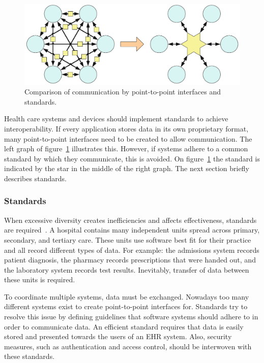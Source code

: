     \begin{figure}[!t]
        \centering
        \includegraphics[width=1\textwidth]{chapters/2_background/interoperability}
        \caption{Comparison of communication by point-to-point interfaces and standards.}\label{fig:interoperability}
    \end{figure}

    \noindent Health care systems and devices should implement standards to achieve interoperability. If every application stores data in its own proprietary format, many point-to-point interfaces need to be created to allow communication. The left graph of figure~\ref{fig:interoperability} illustrates this. However, if systems adhere to a common standard by which they communicate, this is avoided. On figure~\ref{fig:interoperability} the standard is indicated by the star in the middle of the right graph. The next section briefly describes standards.

        \subsubsection{Standards}\label{standards}

        When excessive diversity creates inefficiencies and affects effectiveness, standards are required~\cite{Shortliffe2014}. A hospital contains many independent units spread across primary, secondary, and tertiary care. These units use software best fit for their practice and all record different types of data. For example: the admissions system records patient diagnosis, the pharmacy records prescriptions that were handed out, and the laboratory system records test results. Inevitably, transfer of data between these units is required. 

        To coordinate multiple systems, data must be exchanged. Nowadays too many different systems exist to create point-to-point interfaces for. Standards try to resolve this issue by defining guidelines that software systems should adhere to in order to communicate data. An efficient standard requires that data is easily stored and presented towards the users of an EHR system. Also, security measures, such as authentication and access control, should be interwoven with these standards.

